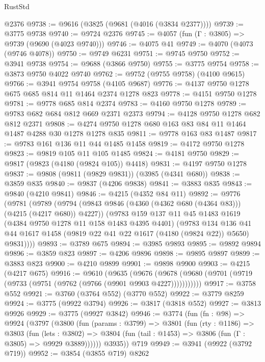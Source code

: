 \begin{lexlean}{RustStd}
\begin{coremodule}
    @2376
@9738 := @9616 (@3825 (@9681 (@4016 (@3834 @2377))))
@9739 := @3775 @9738
@9740 := @9724 @2376
@9745 := @4057 (fun (Γ : @3805) => @9739 (@9690 (@4023 @9740)))
@9746 := @4075 @41
@9749 := @4070 (@4073 (@9746 @4078))
@9750 := @9749 @6231
@9751 := @9745 @9750
@9752 := @3941 @9738
@9754 := @9688 (@3866 @9750)
@9755 := @3775 @9754
@9758 := @3873 @9750 @4022 @9740
@9762 := @9752 (@9755 @9758) (@4100 @9615)
@9766 := @3941 @9754 @9758 (@4105 @9687)
@9776 := @4137 @9750 @1278 @675 @685 @814 @11 @1464 @2374 @1278 @823
@9778 := @4151 @9750 @1278
@9781 := @9778 @685 @814 @2374
@9783 := @4160 @9750 @1278
@9789 := @9783 @682 @684 @812 @669 @2371 @2373
@9794 := @4128 @9750 @1278 @682 @812 @2371
@9808 := @4274 @9750 @1278 @680 @163 @83 @84 @11 @1464 @1487 @4288 @30 @1278 @1278 @835
@9811 := @9778 @163 @83 @1487
@9817 := @9783 @161 @136 @11 @44 @1485 @1458
@9819 := @4172 @9750 @1278
@9823 := @9819 @105 @11 @105 @1485
@9824 := @4181 @9750
@9829 := @9817 (@9823 (@4180 (@9824 @105)) @4418)
@9831 := @4197 @9750 @1278
@9837 := @9808 (@9811 (@9829 @9831)) (@3985 (@4341 @680))
@9838 := @3859 @835
@9840 := @9837 (@4206 @9838)
@9841 := @3883 @835
@9843 := @9840 (@4210 @9841)
@9846 := @4215 (@4352 @84 @11)
@9892 := @9776
    (@9781
      (@9789
        (@9794 (@9843 @9846 (@4360 (@4362 @680 (@4364 @83))) (@4215 (@4217 @680)) @4227))
        (@9783
          @159
          @137
          @11
          @45
          @1483
          @1619
          (@4384 @9750 @1278 @11 @158 @1483 @4395 @4401)
          (@9783
            @134
            @136
            @41
            @44
            @1617
            @1458
            (@9819 @22 @41 @22 @1617 (@4180 (@9824 @22)) @5650)
            @9831))))
@9893 := @3789 @675
@9894 := @3985 @9893
@9895 := @9892 @9894
@9896 := @3859 @823
@9897 := @4206 @9896
@9898 := @9895 @9897
@9899 := @3883 @823
@9900 := @4210 @9899
@9901 := @9898 @9900
@9903 := @4215 (@4217 @675)
@9916 := @9610
    (@9635
      (@9676 (@9678 (@9680 (@9701 (@9719 (@9733 (@9751 (@9762 (@9766 (@9901 @9903 @4227)))))))))))
@9917 := @3758 @552
@9921 := @3760 (@3764 @552) (@3770 @552)
@9922 := @3779 @8259
@9924 := @3775 (@9922 @3794)
@9926 := @3817 (@3818 @552)
@9927 := @3813 @9926
@9929 := @3775 (@9927 @3842)
@9946 := @3774
    (fun (fn : @98) =>
    @9924
      (@3797
        (@3800
          (fun (params : @3799) =>
          @3801
            (fun (rty : @1186) =>
            @3803
              (fun (lets : @3802) =>
              @3804 (fun (tail : @1453) => @3806 (fun (Γ : @3805) => @9929 @3889))))))
        @3935))
    @719
@9949 := @3941 (@9922 (@3792 @719))
@9952 := @3854 (@3855 @719) @8262

\end{coremodule}
\end{lexlean}
